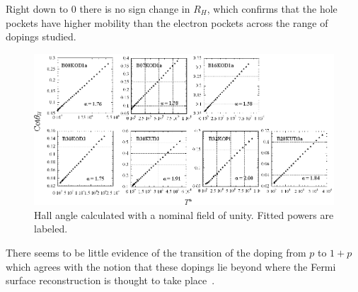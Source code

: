 Right down to \unit{0}{\kelvin} there is no sign change in $R_H$, which confirms that the hole pockets have higher mobility than the electron pockets across the range of dopings studied.

\begin{figure}[htbp]
    \begin{center}
        \includegraphics[scale=0.9]{Chapter-HallBSCO/Figures/HallAngle/HallAngle}
        \caption{Hall angle calculated with a nominal field of unity. Fitted powers are labeled.}
        \label{Fig:ExpH:HallAngle}
    \end{center}
\end{figure}



There seems to be little evidence of the transition of the doping from $p$ to $1+p$ which agrees with the notion that these dopings lie beyond where the Fermi surface reconstruction is thought to take place~\cite{LeBoeuf2007}. 




